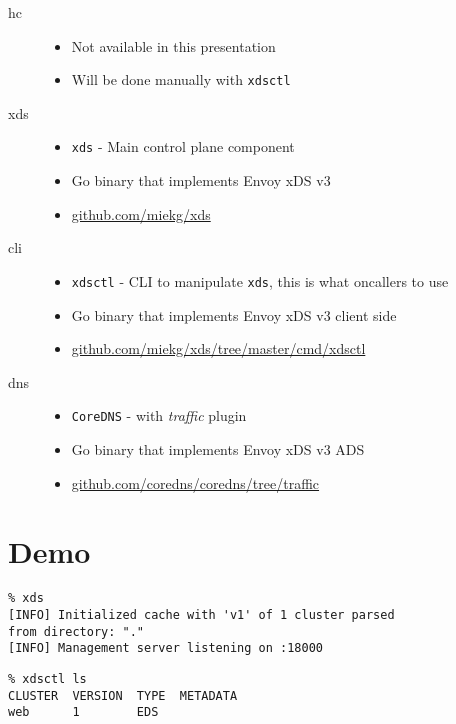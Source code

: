 \documentclass[aspectratio=169]{beamer}
\begin{document}
    \begin{frame}{}
        \begin{description}
            \item[hc]
                \begin{itemize}
                    \item Not available in this presentation
                    \item Will be done manually with \texttt{xdsctl}
                \end{itemize}
            \item[xds]
                \begin{itemize}
                    \item \texttt{xds} - Main control plane component
                    \item Go binary that implements Envoy xDS v3
                    \item \url{github.com/miekg/xds}
                \end{itemize}
            \item[cli]
                \begin{itemize}
                    \item \texttt{xdsctl} - CLI to manipulate \texttt{xds}, this is what oncallers to use
                    \item Go binary that implements Envoy xDS v3 client side
                    \item \url{github.com/miekg/xds/tree/master/cmd/xdsctl}
                \end{itemize}
            \item[dns]
                \begin{itemize}
                    \item \texttt{CoreDNS} - with \emph{traffic} plugin
                    \item Go binary that implements Envoy xDS v3 ADS
                    \item \url{github.com/coredns/coredns/tree/traffic}
                \end{itemize}
        \end{description}
    \end{frame}

    \section{Demo}
    \begin{frame}[fragile]
        \begin{verbatim}
% xds
[INFO] Initialized cache with 'v1' of 1 cluster parsed
from directory: "."
[INFO] Management server listening on :18000
        \end{verbatim}

        \begin{verbatim}
% xdsctl ls
CLUSTER  VERSION  TYPE  METADATA
web      1        EDS
        \end{verbatim}
    \end{frame}
\end{document}
